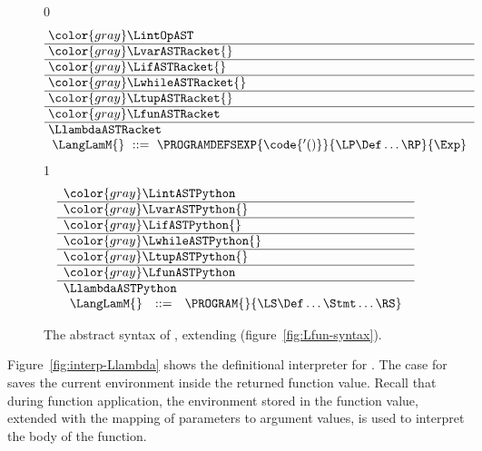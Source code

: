 \documentclass[7x10]{TimesAPriori_MIT}%
\newcommand{\gray}[1]{{\color{gray} #1}}
\def\racketEd{0}
\def\pythonEd{1}
\def\edition{0}
\numberwithin{theorem}{chapter}
\numberwithin{definition}{chapter}
\numberwithin{equation}{chapter}
\begin{document}
\begin{figure}[tp]
\centering
\begin{tcolorbox}[colback=white]
    \small
{\if\edition\racketEd
\[\arraycolsep=3pt
\begin{array}{l}
  \gray{\LintOpAST} \\ \hline
  \gray{\LvarASTRacket{}} \\ \hline
  \gray{\LifASTRacket{}} \\ \hline
  \gray{\LwhileASTRacket{}} \\ \hline
  \gray{\LtupASTRacket{}} \\ \hline
  \gray{\LfunASTRacket} \\ \hline
  \LlambdaASTRacket \\
  \begin{array}{lcl}
  \LangLamM{} &::=& \PROGRAMDEFSEXP{\code{'()}}{\LP\Def\ldots\RP}{\Exp}
  \end{array}
\end{array}
\]
\fi}
{\if\edition\pythonEd
\[
\begin{array}{l}
  \gray{\LintASTPython} \\ \hline
  \gray{\LvarASTPython{}} \\ \hline
  \gray{\LifASTPython{}} \\ \hline
  \gray{\LwhileASTPython{}} \\ \hline
  \gray{\LtupASTPython{}} \\ \hline
  \gray{\LfunASTPython} \\ \hline
  \LlambdaASTPython \\
  \begin{array}{lcl}
  \LangLamM{} &::=& \PROGRAM{}{\LS \Def \ldots \Stmt \ldots \RS}
  \end{array}
\end{array}
\]
\fi}
\end{tcolorbox}

\caption{The abstract syntax of \LangLam{}, extending \LangFun{} (figure~\ref{fig:Lfun-syntax}).}
\label{fig:Llam-syntax}
\end{figure}

\label{sec:interp-Llambda}

Figure~\ref{fig:interp-Llambda} shows the definitional interpreter for
\LangLam{}. The case for  saves the current environment
inside the returned function value. Recall that during function
application, the environment stored in the function value, extended
with the mapping of parameters to argument values, is used to
interpret the body of the function.
\end{document}
